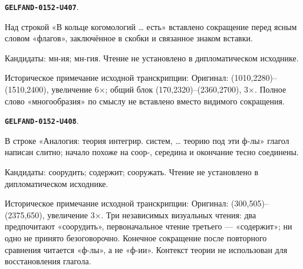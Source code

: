 \documentclass[11pt]{article}
\theoremstyle{definition}
\theoremstyle{remark}
\begin{document}
\par\noindent\leavevmode{}\label{GELFAND-0152-U407}\label{GELFAND-P001404:cohomology-insertion:note}\textbf{\texttt{GELFAND-0152-U407}}.\nopagebreak[4]\par
Над строкой «В кольце когомологий … есть» вставлено сокращение перед ясным словом «флагов», заключённое в скобки и связанное знаком вставки.\par
Кандидаты: мн-ия; мн-гия. Чтение не установлено в дипломатическом исходнике.\par
Историческое примечание исходной транскрипции: Оригинал: (1010,2280)–(1510,2400), увеличение 6×; общий блок (170,2320)–(2360,2700), 3×. Полное слово «многообразия» по смыслу не вставлено вместо видимого сокращения.\par\medskip
\par\noindent\leavevmode{}\label{GELFAND-0152-U408}\label{GELFAND-P001404:analogy-verb:note}\textbf{\texttt{GELFAND-0152-U408}}.\nopagebreak[4]\par
В строке «Аналогия: теория интегрир. систем, … теорию под эти ф-лы» глагол написан слитно; начало похоже на соор-, середина и окончание тесно соединены.\par
Кандидаты: соорудить; содержит; сооружать. Чтение не установлено в дипломатическом исходнике.\par
Историческое примечание исходной транскрипции: Оригинал: (300,505)–(2375,650), увеличение 3×. Три независимых визуальных чтения: два предпочитают «соорудить», первоначальное чтение третьего — «содержит»; ни одно не принято безоговорочно. Конечное сокращение после повторного сравнения читается «ф-лы», а не «ф-ии». Контекст теории не использован для восстановления глагола.\par\medskip
\end{document}
